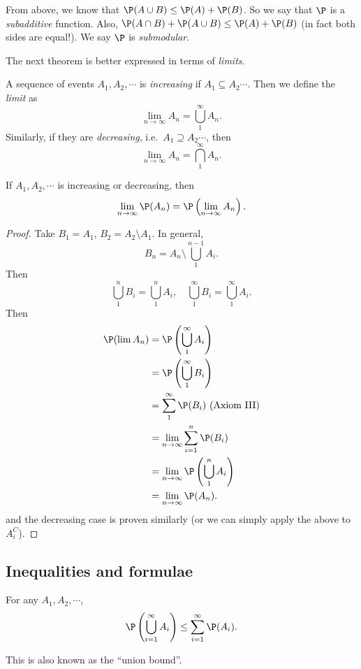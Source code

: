 \documentclass[a4paper]{article}
\begin{document}
From above, we know that $\P(A\cup B) \leq \P(A) + \P(B)$. So we say that $\P$ is a \emph{subadditive} function. Also, $\P(A\cap B) + \P(A \cup B) \leq \P(A) + \P(B)$ (in fact both sides are equal!). We say $\P$ is \emph{submodular}.

The next theorem is better expressed in terms of \emph{limits}.
\begin{defi}
  A sequence of events $A_1, A_2, \cdots$ is \emph{increasing} if $A_1 \subseteq A_2 \cdots$. Then we define the \emph{limit} as
  \[
    \lim_{n\to \infty} A_n = \bigcup_{1}^\infty A_n.
  \]
  Similarly, if they are \emph{decreasing}, i.e.\ $A_1\supseteq A_2\cdots$, then
  \[
    \lim_{n\to \infty} A_n = \bigcap_{1}^\infty A_n.
  \]
\end{defi}

\begin{thm}
  If $A_1, A_2, \cdots$ is increasing or decreasing, then
  \[
    \lim_{n\to \infty} \P(A_n) = \P\left(\lim_{n\to \infty} A_n\right).
  \]
\end{thm}

\begin{proof}
  Take $B_1 = A_1$, $B_2 = A_2\setminus A_1$. In general,
  \[
    B_n = A_n\setminus\bigcup_1^{n - 1}A_i.
  \]
  Then
  \[
    \bigcup_1^n B_i = \bigcup_1^n A_i,\quad \bigcup_1^\infty B_i = \bigcup _1^\infty A_i.
  \]
  Then
  \begin{align*}
    \P(\lim A_n) &= \P\left(\bigcup_1^\infty A_i\right)\\
  &= \P\left(\bigcup_1^\infty B_i\right)\\
  &=\sum_1^\infty \P(B_i)\text{ (Axiom III)}\\
  &= \lim_{n \to \infty}\sum_{i = 1}^n \P(B_i)\\
  &= \lim_{n \to \infty} \P\left(\bigcup_1^n A_i\right)\\
  &= \lim_{n \to \infty} \P(A_n).
  \end{align*}
  and the decreasing case is proven similarly (or we can simply apply the above to $A_i^C$).
\end{proof}

\subsection{Inequalities and formulae}
\begin{thm}
  For any $A_1, A_2, \cdots$,
  \[
    \P\left(\bigcup_{i = 1}^\infty A_i\right) \leq \sum_{i = 1}^\infty \P(A_i).
  \]
\end{thm}
This is also known as the ``union bound''.
\end{document}
